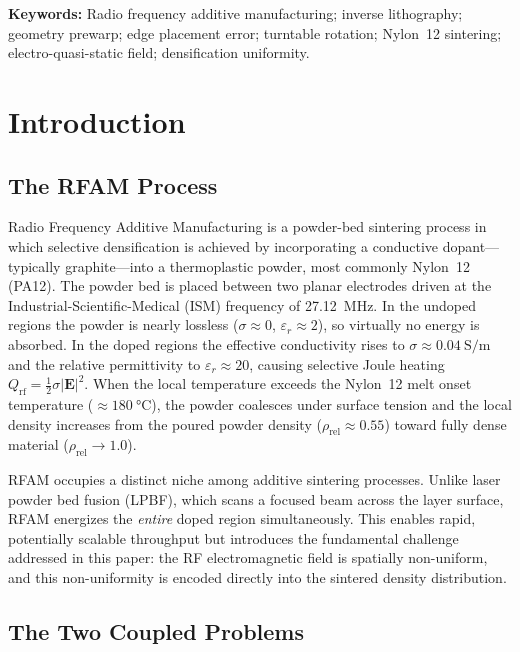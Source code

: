 \documentclass[10pt,twocolumn]{article}
\newcommand{\Qrf}{Q_{\mathrm{rf}}}
\newcommand{\rhorel}{\rho_{\mathrm{rel}}}
\newcommand{\vect}[1]{\boldsymbol{#1}}
\newcommand{\half}{\tfrac{1}{2}}
\begin{document}
\noindent\textbf{Keywords:} Radio frequency additive manufacturing;
inverse lithography; geometry prewarp; edge placement error; turntable
rotation; Nylon~12 sintering; electro-quasi-static field; densification
uniformity.

\section{Introduction}
\label{sec:introduction}

\subsection{The RFAM Process}

Radio Frequency Additive Manufacturing is a powder-bed sintering
process in which selective densification is achieved by incorporating
a conductive dopant---typically graphite---into a thermoplastic powder,
most commonly Nylon~12 (PA12).  The powder bed is placed between two
planar electrodes driven at the Industrial-Scientific-Medical (ISM)
frequency of \SI{27.12}{\mega\hertz}.  In the undoped regions the
powder is nearly lossless ($\sigma \approx 0$, $\varepsilon_r \approx
2$), so virtually no energy is absorbed.  In the doped regions the
effective conductivity rises to $\sigma \approx \SI{0.04}{\siemens\per\meter}$
and the relative permittivity to $\varepsilon_r \approx 20$, causing
selective Joule heating $\Qrf = \half\sigma|\vect{E}|^{2}$.  When the
local temperature exceeds the Nylon~12 melt onset temperature
($\approx\SI{180}{\celsius}$), the powder coalesces under surface
tension and the local density increases from the poured powder density
($\rhorel \approx 0.55$) toward fully dense material ($\rhorel \to
1.0$).

RFAM occupies a distinct niche among additive sintering processes.
Unlike laser powder bed fusion (LPBF), which scans a focused beam
across the layer surface, RFAM energizes the \emph{entire} doped
region simultaneously.  This enables rapid, potentially scalable
throughput but introduces the fundamental challenge addressed in this
paper: the RF electromagnetic field is spatially non-uniform, and
this non-uniformity is encoded directly into the sintered density
distribution.

\subsection{The Two Coupled Problems}
\end{document}
